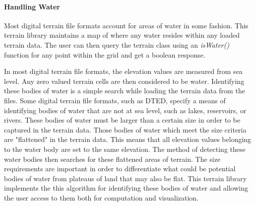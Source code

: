 \paragraph{Handling Water}
Most digital terrain file formats account for areas of water in some fashion.  This terrain library maintains a map of where any water resides within any loaded terrain data.  The user can then query the terrain class using an \textit{isWater()} function for any point within the grid and get a boolean response.

In most digital terrain file formats, the elevation values are measured from sea level.  Any zero valued terrain cells are then considered to be water.  Identifying these bodies of water is a simple search while loading the terrain data from the files.  Some digital terrain file formats, such as DTED, specify a means of identifying bodies of water that are not at sea level, such as lakes, reservoirs, or rivers.  These bodies of water must be larger than a certain size in order to be captured in the terrain data.  Those bodies of water which meet the size criteria are "flattened" in the terrain data.  This means that all elevation values belonging to the water body are set to the same elevation.  The method of detecting these water bodies then searches for these flattened areas of terrain.  The size requirements are important in order to differentiate what could be potential bodies of water from plateaus of land that may also be flat. This terrain library implements the this algorithm for identifying these bodies of water and allowing the user access to them both for computation and visualization.

